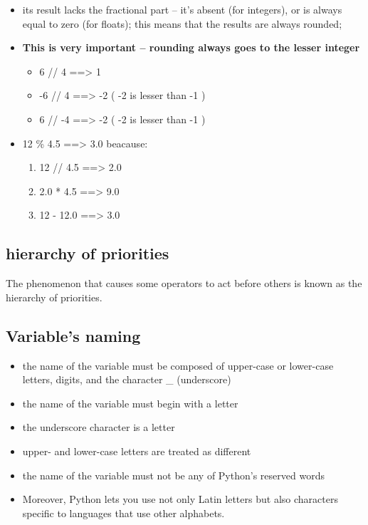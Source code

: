\documentclass[11pt]{article}
\begin{document}
\begin{itemize}
\item its result lacks the fractional part – it’s absent (for integers),
or is always equal to zero (for floats); this means that the
results are always rounded;

\item \textbf{This is very important – rounding always goes to the lesser
integer}
\begin{itemize}
\item 6 // 4 ==> 1
\item -6 // 4 ==> -2 ( -2 is lesser than -1 )
\item 6 // -4 ==> -2 ( -2 is lesser than -1 )
\end{itemize}

\item 12 \% 4.5 ==> 3.0 beacause:
\begin{enumerate}
\item 12 // 4.5 ==> 2.0
\item 2.0 * 4.5 ==> 9.0
\item 12 - 12.0 ==> 3.0
\end{enumerate}
\end{itemize}

\subsection{hierarchy of priorities}
\label{sec:orgfa2d752}
The phenomenon that causes some operators to act before others is
known as the hierarchy of priorities.
\subsection{Variable's naming}
\label{sec:org52dd608}
\begin{itemize}
\item the name of the variable must be composed of upper-case or
lower-case letters, digits, and the character \_ (underscore)
\item the name of the variable must begin with a letter
\item the underscore character is a letter
\item upper- and lower-case letters are treated as different
\item the name of the variable must not be any of Python’s reserved words
\item Moreover, Python lets you use not only Latin letters but also
characters specific to languages that use other alphabets.
\end{itemize}
\end{document}
